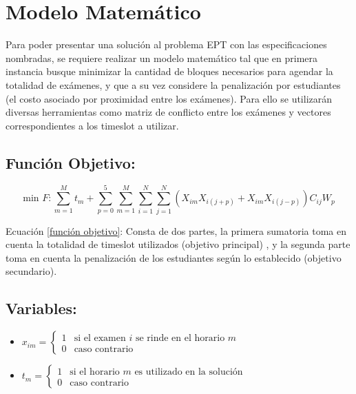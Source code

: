 \section{Modelo Matem\'atico}
\label{Modelo}
Para poder presentar una solución al problema EPT con las especificaciones nombradas, se requiere realizar un modelo matemático tal que en primera instancia busque minimizar la cantidad de bloques necesarios para agendar la totalidad de exámenes, y que a su vez considere la penalización por estudiantes (el costo asociado por proximidad entre los exámenes). Para ello se utilizarán diversas herramientas como matriz de conflicto entre los exámenes y vectores correspondientes a los timeslot a utilizar.

\subsection{Función Objetivo:}
\begin{equation}
    \label{función objetivo}
    \text{min } F: \sum_{m=1}^M t_m + \sum_{p=0}^5 \sum_{m=1}^M \sum_{i=1}^N \sum_{j=1}^N (X_{im}X_{i(j+p)}+X_{im}X_{i(j-p)})C_{ij}W_{p}
\end{equation}
\begin{center}
    Ecuación \ref{función objetivo}: Consta de dos partes, la primera sumatoria toma en cuenta la totalidad de timeslot utilizados (objetivo principal) , y la segunda parte toma en cuenta la penalización de los estudiantes según lo establecido (objetivo secundario).
\end{center}

\subsection{Variables:}
\begin{center}
\begin{itemize}
	\item $x_{im} =
					\left\{
						\begin{array}{ll}
							1  & \mbox{si el examen } i \text{ se rinde en el horario } m \\
							0 & \mbox{caso contrario}
						\end{array}
					\right.$
	\item $t_{m} =
					\left\{
						\begin{array}{ll}
							1  & \mbox{si el horario } m \text{ es utilizado en la solución}\\
							0 & \mbox{caso contrario}
						\end{array}
					\right.$

\end{itemize}

\end{center}
